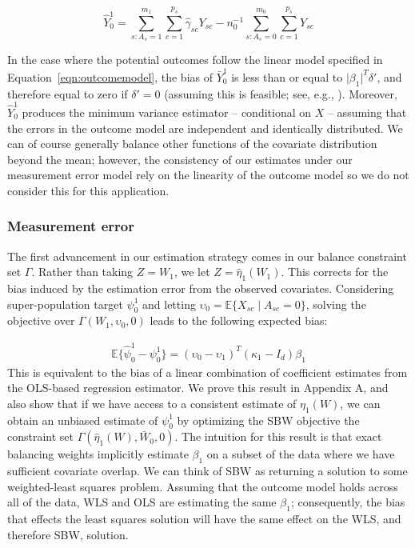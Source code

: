 \documentclass[aoas]{imsart}
\theoremstyle{plain}
\theoremstyle{remark}
\begin{document}
\begin{equation}\label{eqn:psi}
\hat{Y}_0^1 = \sum_{s: A_s = 1}^{m_1}\sum_{c = 1}^{p_s}\hat{\gamma}_{sc} Y_{sc} - n_0^{-1}\sum_{s: A_s = 0}^{m_0}\sum_{c = 1}^{p_s}Y_{sc}
\end{equation}

In the case where the potential outcomes follow the linear model specified in Equation~\ref{eqn:outcomemodel}, the bias of $\bar{Y}^1_0$ is less than or equal to $\lvert\beta_1\rvert^T\delta'$, and therefore equal to zero if $\delta' = 0$ (assuming this is feasible; see, e.g., \cite{zubizarreta2015stable}). Moreover, $\hat{Y}_0^1$ produces the minimum variance estimator -- conditional on $X$ -- assuming that the errors in the outcome model are independent and identically distributed. We can of course generally balance other functions of the covariate distribution beyond the mean; however, the consistency of our estimates under our measurement error model rely on the linearity of the outcome model so we do not consider this for this application.

\subsubsection{Measurement error}\label{ssec:methodsmsrment}

The first advancement in our estimation strategy comes in our balance constraint set $\Gamma$. Rather than taking $Z = W_1$, we let $Z = \hat{\eta}_1(W_1)$. This corrects for the bias induced by the estimation error from the observed covariates. Considering super-population target $\psi_0^1$ and letting $\upsilon_0 = \mathbb{E}\{X_{sc} \mid A_{sc} = 0\}$, solving the objective over $\Gamma(W_1, \upsilon_0, 0)$ leads to the following expected bias:

\begin{align*}
\mathbb{E}\{\hat{\psi}^{1}_0 - \psi^1_0\} = (\upsilon_0 - \upsilon_1)^T(\kappa_1 - I_d)\beta_1  
\end{align*}
%
This is equivalent to the bias of a linear combination of coefficient estimates from the OLS-based regression estimator. We prove this result in Appendix A, and also show that if we have access to a consistent estimate of $\eta_1(W)$, we can obtain an unbiased estimate of $\psi_0^1$ by optimizing the SBW objective the constraint set $\Gamma(\hat{\eta}_1(W), \bar{W}_0, 0)$. The intuition for this result is that exact balancing weights implicitly estimate $\beta_1$ on a subset of the data where we have sufficient covariate overlap. We can think of SBW as returning a solution to some weighted-least squares problem. Assuming that the outcome model holds across all of the data, WLS and OLS are estimating the same $\beta_1$; consequently, the bias that effects the least squares solution will have the same effect on the WLS, and therefore SBW, solution. 
\end{document}
